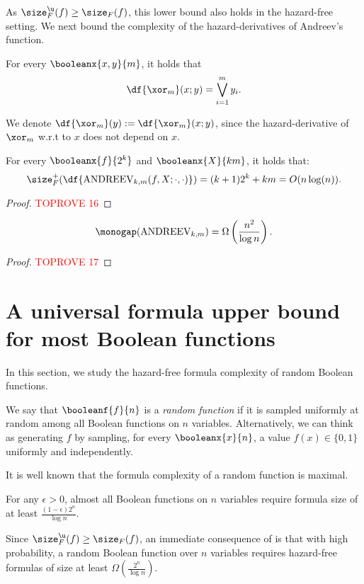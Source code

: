 \documentclass[acmsmall, nonacm, authorversion]{acmart}
\begin{document}
As $\size_F^\u(f)\ge \size_F(f)$, this lower bound also holds in the hazard-free setting. We next bound the complexity of the hazard-derivatives of Andreev's function.

\begin{fact}\label{fact:parity-der}
For every $\booleanx{x,y}{m}$, it holds that 
\[
\df{\xor_m}(x;y)=\bigvee_{i=1}^{m}y_i.
\]
\end{fact}

We denote $\df{\xor_m}(y):=\df{\xor_m}(x;y)$, since the hazard-derivative of $\xor_m$ w.r.t to $x$ does not depend on $x$.

\begin{claim}\label{claim:andreev-der}
For every $\booleanx{f}{2^k}$ and $\booleanx{X}{km}$, it holds that:
\[
\size_F^+(\df{\text{ANDREEV}_{k,m}(f,X;\cdot,\cdot)})=(k+1)2^k+km=O(n\log(n)).
\]
\end{claim}
\begin{proof}\textcolor{red}{TOPROVE 16}\end{proof}

\begin{corollary}
    \[
    \monogap(\text{ANDREEV}_{k,m})=\Omega\left(\frac{n^2}{\log n}\right).
    \]
\end{corollary}
\begin{proof}\textcolor{red}{TOPROVE 17}\end{proof}

\section{A universal formula upper bound for most Boolean functions}\label{sec:universal}
In this section, we study the hazard-free formula complexity of random Boolean functions. 

\begin{definition}\label{def:random-boolean-function}
We say that $\booleanf{f}{n}$ is a \emph{random function} if it is sampled uniformly at random among all Boolean functions on $n$ variables. Alternatively, we can think as generating $f$ by sampling, for every $\booleanx{x}{n}$, a value $f(x)\in \{0,1\}$ uniformly and independently.
\end{definition}

It is well known that the formula complexity of a random function is maximal. 
\begin{theorem}\label{thm:almost-all-formulas-are-large}
For any $\epsilon>0$, almost all Boolean functions on $n$ variables require formula size of at least $\frac{(1-\epsilon)2^n}{\log n}$.
\end{theorem}
Since $\size_F^\u(f)\ge \size_F(f)$, an immediate consequence of  is that with high probability, a random Boolean function over $n$ variables requires hazard-free formulas of size at least $\Omega(\frac{2^n}{\log n})$.
\end{document}
